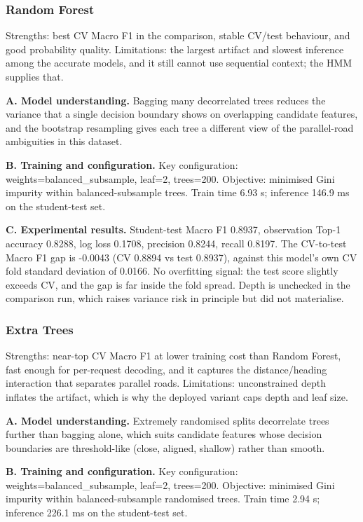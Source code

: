 \documentclass[11pt,a4paper]{article}
\begin{document}
\subsubsection{Random Forest}

Strengths: best CV Macro F1 in the comparison, stable CV/test behaviour, and good probability quality. Limitations: the largest artifact and slowest inference among the accurate models, and it still cannot use sequential context; the HMM supplies that.

\noindent\textbf{A. Model understanding.} Bagging many decorrelated trees reduces the variance that a single decision boundary shows on overlapping candidate features, and the bootstrap resampling gives each tree a different view of the parallel-road ambiguities in this dataset.

\noindent\textbf{B. Training and configuration.} Key configuration: weights=balanced\_subsample, leaf=2, trees=200. Objective: minimised Gini impurity within balanced-subsample trees. Train time 6.93 s; inference 146.9 ms on the student-test set.

\noindent\textbf{C. Experimental results.} Student-test Macro F1 0.8937, observation Top-1 accuracy 0.8288, log loss 0.1708, precision 0.8244, recall 0.8197. The CV-to-test Macro F1 gap is -0.0043 (CV 0.8894 vs test 0.8937), against this model's own CV fold standard deviation of 0.0166. No overfitting signal: the test score slightly exceeds CV, and the gap is far inside the fold spread. Depth is unchecked in the comparison run, which raises variance risk in principle but did not materialise.

\subsubsection{Extra Trees}

Strengths: near-top CV Macro F1 at lower training cost than Random Forest, fast enough for per-request decoding, and it captures the distance/heading interaction that separates parallel roads. Limitations: unconstrained depth inflates the artifact, which is why the deployed variant caps depth and leaf size.

\noindent\textbf{A. Model understanding.} Extremely randomised splits decorrelate trees further than bagging alone, which suits candidate features whose decision boundaries are threshold-like (close, aligned, shallow) rather than smooth.

\noindent\textbf{B. Training and configuration.} Key configuration: weights=balanced\_subsample, leaf=2, trees=200. Objective: minimised Gini impurity within balanced-subsample randomised trees. Train time 2.94 s; inference 226.1 ms on the student-test set.
\end{document}
